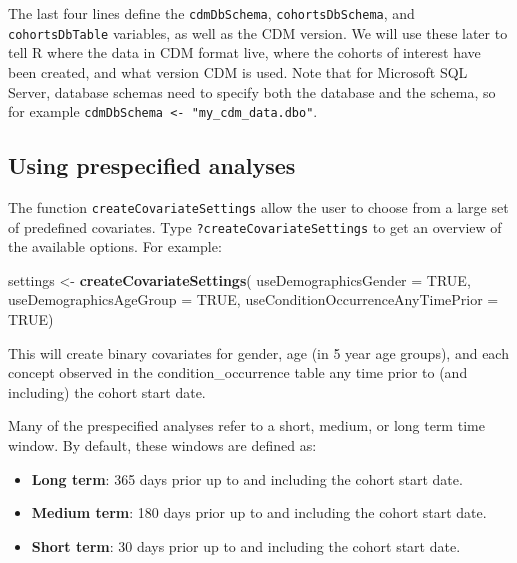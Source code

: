 \documentclass[11pt]{book}
\newenvironment{Shaded}{\begin{snugshade}}{\end{snugshade}}
\newcommand{\DataTypeTok}[1]{\textcolor[rgb]{0.13,0.29,0.53}{#1}}
\newcommand{\KeywordTok}[1]{\textcolor[rgb]{0.13,0.29,0.53}{\textbf{#1}}}
\newcommand{\NormalTok}[1]{#1}
\newcommand{\OtherTok}[1]{\textcolor[rgb]{0.56,0.35,0.01}{#1}}
\newcommand{\StringTok}[1]{\textcolor[rgb]{0.31,0.60,0.02}{#1}}
\providecommand{\tightlist}{%
  \setlength{\itemsep}{0pt}\setlength{\parskip}{0pt}}
\theoremstyle{definition}
\theoremstyle{definition}
\theoremstyle{definition}
\theoremstyle{remark}
\begin{document}
The last four lines define the \texttt{cdmDbSchema}, \texttt{cohortsDbSchema}, and \texttt{cohortsDbTable} variables, as well as the CDM version. We will use these later to tell R where the data in CDM format live, where the cohorts of interest have been created, and what version CDM is used. Note that for Microsoft SQL Server, database schemas need to specify both the database and the schema, so for example \texttt{cdmDbSchema\ \textless{}-\ "my\_cdm\_data.dbo"}.

\hypertarget{using-prespecified-analyses}{%
\subsection{Using prespecified analyses}\label{using-prespecified-analyses}}

The function \texttt{createCovariateSettings} allow the user to choose from a large set of predefined covariates. Type \texttt{?createCovariateSettings} to get an overview of the available options. For example:

\begin{Shaded}
\begin{Highlighting}[]
\NormalTok{settings <-}\StringTok{ }\KeywordTok{createCovariateSettings}\NormalTok{(}
  \DataTypeTok{useDemographicsGender =} \OtherTok{TRUE}\NormalTok{, }
  \DataTypeTok{useDemographicsAgeGroup =} \OtherTok{TRUE}\NormalTok{, }
  \DataTypeTok{useConditionOccurrenceAnyTimePrior =} \OtherTok{TRUE}\NormalTok{) }
\end{Highlighting}
\end{Shaded}

This will create binary covariates for gender, age (in 5 year age groups), and each concept observed in the condition\_occurrence table any time prior to (and including) the cohort start date.

Many of the prespecified analyses refer to a short, medium, or long term time window. By default, these windows are defined as:

\begin{itemize}
\tightlist
\item
  \textbf{Long term}: 365 days prior up to and including the cohort start date.
\item
  \textbf{Medium term}: 180 days prior up to and including the cohort start date.
\item
  \textbf{Short term}: 30 days prior up to and including the cohort start date.
\end{itemize}
\end{document}
